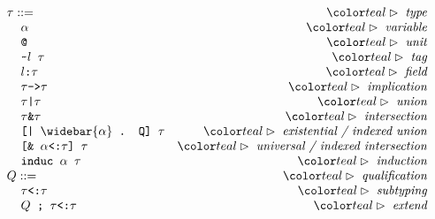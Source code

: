 \documentclass[sigplan,screen,review]{acmart}
\begin{document}
\begin{figure*}[h]
\[
\begin{array}[t]{l r}
\tau ::= &\C{type}
  \\
  \I \code{$\alpha$}  &\C{variable}
  \\
  \I \code{@} &\C{unit}
  \\
  \I \code{\textasciitilde{}$l$ $\tau$} &\C{tag}
  \\
  \I \code{$l$:$\tau$} &\C{field}
  \\
  \I \code{$\tau$->$\tau$} &\C{implication}
  \\
  \I \code{$\tau$|$\tau$} &\C{union}
  \\
  \I \code{$\tau$\&$\tau$} &\C{intersection}
  \\
  \I \code{[| $\widebar{\alpha}$ . Q] $\tau$} &\C{existential / indexed union}
  \\
  \I \code{[\& $\alpha$<:$\tau$] $\tau$} &\C{universal / indexed intersection}
  \\
  \I \code{induc $\alpha$ $\tau$} &\C{induction}
  \\
  Q ::= &\C{qualification}
  \\
  \I \code{$\tau$<:$\tau$} &\C{subtyping}
  \\
  \I \code{$Q$ ; $\tau$<:$\tau$} &\C{extend}
  \\
\end{array}
\]


\end{figure*}
\end{document}
